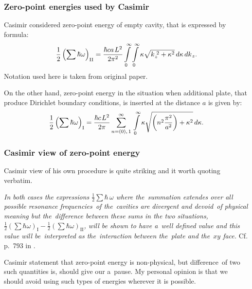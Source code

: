 \documentclass[10pt,t]{beamer}
\begin{document}
\begin{frame}
  \frametitle{Zero-point energies used by Casimir}


  Casimir considered zero-point energy of empty cavity, that is expressed
  by formula:
  \begin{equation}
    \label{eq:Herdegens-approach-01}
    \frac{ 1 }{ 2 } \left( \sum \hbar \omega \right)_{ \text{II} } =
    \frac{ \hbar c a \hspace{0.11em} L^{ 2 } }{ 2 \pi^{ 2 } }
    \int\limits_{ 0 }^{ \infty } \int\limits_{ 0 }^{ \infty } \kappa
    \sqrt{ k_{ \hspace{0.05em} z }^{ \,\, 2 } + \kappa^{ 2 } } \, d\kappa \,
    dk_{ \hspace{0.07em} z }.
  \end{equation}
  Notation used here is taken from original paper.

  On the other hand, zero-point energy in the situation when additional
  plate, that produce Dirichlet boundary conditions, is inserted at the
  distance $a$ is given by:
  \begin{equation}
    \label{eq:Herdegens-approach-02}
    \frac{ 1 }{ 2 } \left( \sum \hbar \omega \right)_{ \text{I} } =
    \frac{ \hbar c \hspace{0.11em} L^{ 2 } }{ 2 \pi }
    \sum_{ n = ( 0 ), \, 1 }^{ \infty } \, \int\limits_{ 0 }^{ \infty } \kappa
    \sqrt{ \left( n^{ 2 } \frac{ \pi^{ 2 } }{ a^{ 2 } } \right)
      + \kappa^{ 2 } } \, d\kappa.
  \end{equation}

\end{frame}





\begin{frame}
  \frametitle{Casimir view of zero-point energy}


  Casimir view of his own procedure is quite striking and it worth quoting
  verbatim.

  \textit{In both cases the expressions $\frac{ 1 }{ 2 } \sum \hbar \, \omega$ where
    the~summation extendes over all possible resonance frequencies~of
    the~cavities are divergent and devoid~of physical meaning but
    the~\textit{difference} between these sums in the two situations,
    $\frac{ 1 }{ 2 } ( \sum \hbar \omega )_{ \text{I} } -
    \frac{ 1 }{ 2 } ( \sum \hbar \omega )_{ \text{II} }$, will be shown to have
    a~well defined value and this value will be~interpreted as
    the~interaction between the~plate and the~$xy$ face.} Cf. p.~793 in
  \parencite{Casimir-On-the-Attraction-Between-ETC-Pub-1948}.

  Casimir statement that zero-point energy is non-physical, but
  difference~of \alert{two} such quantities is, should give our a~pause.
  My personal opinion is that we should avoid using such types of energies
  wherever it is possible.

\end{frame}
\end{document}
